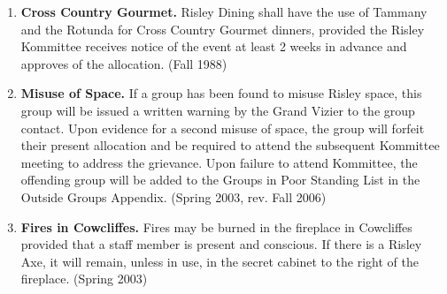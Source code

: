 \documentclass[12pt]{article}
\begin{document}
\begin{enumerate}[1.]
\item \textbf{Cross Country Gourmet.} Risley Dining shall have the use of Tammany and the Rotunda for Cross Country Gourmet dinners, provided the Risley Kommittee receives notice of the event at least 2 weeks in advance and approves of the allocation. (Fall 1988)
\item \textbf{Misuse of Space.} If a group has been found to misuse Risley space, this group will be issued a written warning by the Grand Vizier to the group contact. Upon evidence for a second misuse of space, the group will forfeit their present allocation and be required to attend the subsequent Kommittee meeting to address the grievance. Upon failure to attend Kommittee, the offending group will be added to the Groups in Poor Standing List in the Outside Groups Appendix. (Spring 2003, rev. Fall 2006)
\item \textbf{Fires in Cowcliffes.} Fires may be burned in the fireplace in Cowcliffes provided that a staff member is present and conscious. If there is a Risley Axe, it will remain, unless in use, in the secret cabinet to the right of the fireplace. (Spring 2003) 
\end{enumerate}
\end{document}
